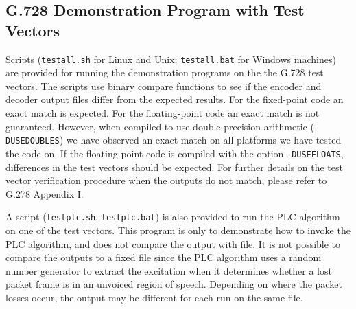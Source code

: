 \subsection {G.728 Demonstration Program with Test Vectors}

Scripts ({\tt testall.sh} for Linux and Unix; {\tt testall.bat} for
Windows machines)
are provided for running the demonstration programs on the the G.728 test vectors. The scripts use binary compare functions to see if
the encoder and decoder output files differ
from the expected results.
For the fixed-point code an exact match is expected.
For the floating-point code an exact match is not guaranteed.
However, when compiled to use double-precision
arithmetic ({\tt -DUSEDOUBLES}) we have observed an exact match on
all platforms we have tested the code on.
If the floating-point code is compiled with the option {\tt -DUSEFLOATS},
differences in the test vectors should be expected.
For further details on the test vector verification
procedure when the outputs do not match, please refer to G.278
Appendix I.

A script ({\tt testplc.sh}, {\tt testplc.bat}) is also provided to run
the PLC algorithm on one of the test vectors. This program is only to
demonstrate how to invoke the PLC algorithm, and does not compare the
output with file. It is not possible to compare the outputs to a fixed
file since the PLC algorithm uses a random number generator to extract
the excitation when it determines whether a lost packet frame is in an
unvoiced region of speech. Depending on where the packet losses occur,
the output may be different for each run on the same file.
